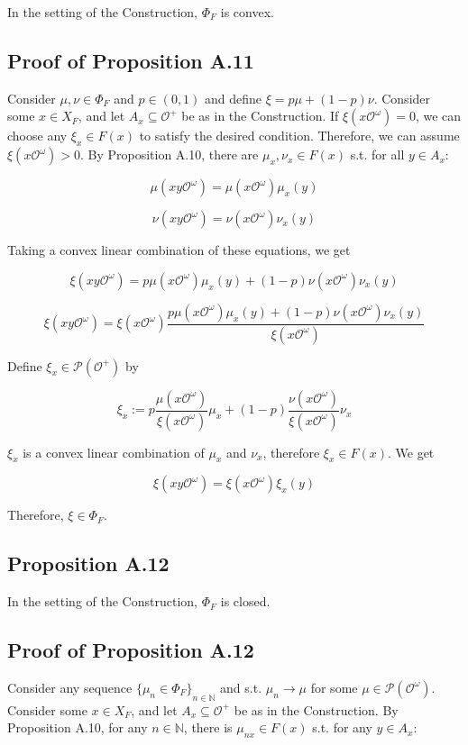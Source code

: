 \documentclass[a4paper]{article}
\newcommand{\Nats}{\mathbb{N}}
\newcommand{\Prob}{\mathcal{P}}
\newcommand{\Obs}{\mathcal{O}}
\newcommand{\ObsO}{\Obs^\omega}
\begin{document}
In the setting of the Construction, ${\Phi_F}$ is convex.

\subsection{Proof of Proposition A.11}

Consider ${\mu,\nu \in \Phi_F}$ and ${p \in (0,1)}$ and define ${\xi = p \mu + (1-p) \nu}$. Consider some ${x \in X_F}$, and let ${A_x \subseteq \Obs^+}$ be as in the Construction. If ${\xi(x\ObsO)=0}$, we can choose any ${\xi_x \in F(x)}$ to satisfy the desired condition. Therefore, we can assume ${\xi(x\ObsO) > 0}$. By Proposition A.10, there are ${\mu_x, \nu_x \in F(x)}$ s.t. for all ${y \in A_x}$:

$$\mu(xy\ObsO) = \mu(x\ObsO) \mu_x(y)$$

$$\nu(xy\ObsO) = \nu(x\ObsO) \nu_x(y)$$

Taking a convex linear combination of these equations, we get

$$\xi(xy\ObsO) = p \mu(x\ObsO) \mu_x(y) + (1-p) \nu(x\ObsO) \nu_x(y)$$

$$\xi(xy\ObsO) = \xi(x\ObsO) \frac{p \mu(x\ObsO) \mu_x(y) + (1-p) \nu(x\ObsO) \nu_x(y)}{\xi(x\ObsO)}$$

Define ${\xi_x \in \Prob(\Obs^+)}$ by 

$$\xi_x := p\frac{\mu(x\ObsO)}{\xi(x\ObsO)}\mu_x+(1-p)\frac{\nu(x\ObsO)}{\xi(x\ObsO)}\nu_x$$

${\xi_x}$ is a convex linear combination of ${\mu_x}$ and ${\nu_x}$, therefore ${\xi_x \in F(x)}$. We get

$$\xi(xy\ObsO) = \xi(x\ObsO) \xi_x(y)$$

Therefore, ${\xi \in \Phi_F}$.

\subsection{Proposition A.12}

In the setting of the Construction, ${\Phi_F}$ is closed.

\subsection{Proof of Proposition A.12}

Consider any sequence ${\{\mu_n \in \Phi_F\}}_{n \in \Nats}$ and s.t. ${\mu_n \rightarrow \mu}$ for some ${\mu \in \Prob(\ObsO)}$. Consider some ${x \in X_F}$, and let ${A_x \subseteq \Obs^+}$ be as in the Construction. By Proposition A.10, for any ${n \in \Nats}$, there is ${\mu_{nx} \in F(x)}$ s.t. for any ${y \in A_x}$:
\end{document}
